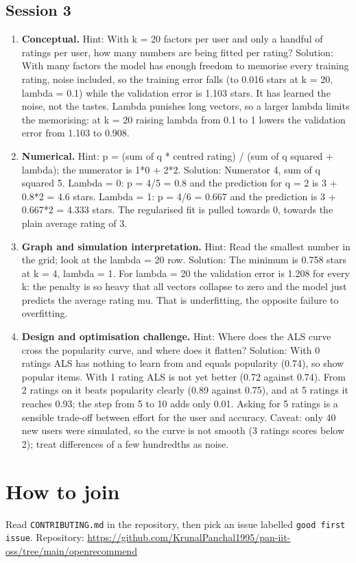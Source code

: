 \documentclass[11pt,a4paper]{article}
\begin{document}
\subsection*{Session 3}
\begin{enumerate}[nosep]
\item \textbf{Conceptual.} Hint: With k = 20 factors per user and only a handful of ratings per user, how many numbers are being fitted per rating? Solution: With many factors the model has enough freedom to memorise every training rating, noise included, so the training error falls (to 0.016 stars at k = 20, lambda = 0.1) while the validation error is 1.103 stars. It has learned the noise, not the tastes. Lambda punishes long vectors, so a larger lambda limits the memorising: at k = 20 raising lambda from 0.1 to 1 lowers the validation error from 1.103 to 0.908.
\item \textbf{Numerical.} Hint: p = (sum of q * centred rating) / (sum of q squared + lambda); the numerator is 1*0 + 2*2. Solution: Numerator 4, sum of q squared 5. Lambda = 0: p = 4/5 = 0.8 and the prediction for q = 2 is 3 + 0.8*2 = 4.6 stars. Lambda = 1: p = 4/6 = 0.667 and the prediction is 3 + 0.667*2 = 4.333 stars. The regularised fit is pulled towards 0, towards the plain average rating of 3.
\item \textbf{Graph and simulation interpretation.} Hint: Read the smallest number in the grid; look at the lambda = 20 row. Solution: The minimum is 0.758 stars at k = 4, lambda = 1. For lambda = 20 the validation error is 1.208 for every k: the penalty is so heavy that all vectors collapse to zero and the model just predicts the average rating mu. That is underfitting, the opposite failure to overfitting.
\item \textbf{Design and optimisation challenge.} Hint: Where does the ALS curve cross the popularity curve, and where does it flatten? Solution: With 0 ratings ALS has nothing to learn from and equals popularity (0.74), so show popular items. With 1 rating ALS is not yet better (0.72 against 0.74). From 2 ratings on it beats popularity clearly (0.89 against 0.75), and at 5 ratings it reaches 0.93; the step from 5 to 10 adds only 0.01. Asking for 5 ratings is a sensible trade-off between effort for the user and accuracy. Caveat: only 40 new users were simulated, so the curve is not smooth (3 ratings scores below 2); treat differences of a few hundredths as noise.
\end{enumerate}

\section{How to join}
Read \texttt{CONTRIBUTING.md} in the repository, then pick an issue labelled \texttt{good first issue}. Repository: \url{https://github.com/KrunalPanchal1995/pan-iit-oss/tree/main/openrecommend}
\end{document}

